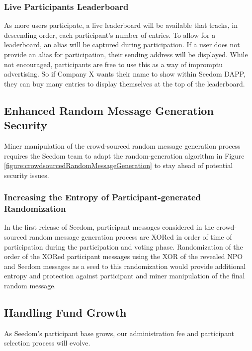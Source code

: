 \documentclass[11pt]{article}
\begin{document}
\subsubsection{Live Participants Leaderboard}
\label{sec:liveParticipantsLeaderboard}

As more users participate, a live leaderboard will be available that tracks, in descending order, each participant's number of entries. To allow for a leaderboard, an alias will be captured during participation. If a user does not provide an alias for participation, their sending address will be displayed. While not encouraged, participants are free to use this as a way of impromptu advertising. So if Company X wants their name to show within Seedom DAPP, they can buy many entries to display themselves at the top of the leaderboard.

\subsection{Enhanced Random Message Generation Security}

Miner manipulation of the crowd-sourced random message generation process requires the Seedom team to adapt the random-generation algorithm in Figure \ref{figure:crowdsourcedRandomMessageGeneration} to stay ahead of potential security issues.

\subsubsection{Increasing the Entropy of Participant-generated Randomization}
\label{sec:increasingTheEntropyOfParticipantGeneratedRandomization}

In the first release of Seedom, participant messages considered in the crowd-sourced random message generation process are XORed in order of time of participation during the participation and voting phase. Randomization of the order of the XORed participant messages using the XOR of the revealed NPO and Seedom messages as a seed to this randomization would provide additional entropy and protection against participant and miner manipulation of the final random message.

\subsection{Handling Fund Growth}

As Seedom's participant base grows, our administration fee and participant selection process will evolve.
\end{document}
